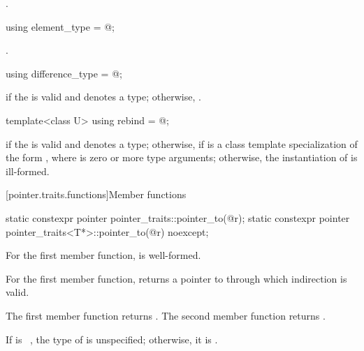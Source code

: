 \begin{itemdescr}
\pnum
\ctype {}.
\end{itemdescr}

%
\begin{itemdecl}
using element_type = @\seebelow@;
\end{itemdecl}

\begin{itemdescr}
\pnum
\ctype {}.
\end{itemdescr}

%
\begin{itemdecl}
using difference_type = @\seebelow@;
\end{itemdecl}

\begin{itemdescr}
\pnum
\ctype {} if
the   is valid and denotes a
type; otherwise,
.
\end{itemdescr}

%
\begin{itemdecl}
template<class U> using rebind = @\seebelow@;
\end{itemdecl}

\begin{itemdescr}
\pnum
\templalias {} if
the   is valid and denotes a
type; otherwise,
 if
 is a class template specialization of the form ,
where  is zero or more type arguments; otherwise, the instantiation of
 is ill-formed.
\end{itemdescr}

[pointer.traits.functions]{Member functions}

%
\begin{itemdecl}
static constexpr pointer pointer_traits::pointer_to(@\seebelow@ r);
static constexpr pointer pointer_traits<T*>::pointer_to(@\seebelow@ r) noexcept;
\end{itemdecl}

\begin{itemdescr}
\pnum
\mandates
For the first member function,
 is well-formed.

\pnum
\expects
For the first member function,
 returns a pointer to 
through which indirection is valid.

\pnum
\returns
The first member function returns .
The second member function returns .

\pnum
\remarks
If  is \cv{}~, the type of
 is unspecified; otherwise, it is .
\end{itemdescr}


